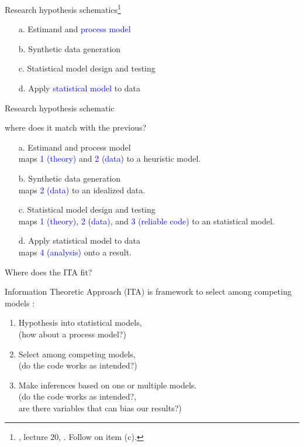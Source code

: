 \begin{lhframe}[rhgraphic={\texttt{[image: lab2.jpg]}}]
	{Research hypothesis schematics\footnote{\citet{McElreath_2022}, lecture $20$, \citet{Pearl_2019}. Follow \citet{Fogarty_et_al_2022} on item (c).}}
	
	\begin{enumerate}
		\item[a.] Estimand and \textcolor{blue}{process model}
		\item[b.] Synthetic data generation
		\item[c.] Statistical model design and testing
		\item[d.] Apply \textcolor{blue}{statistical model} to data 
	\end{enumerate} 
\end{lhframe}
%
%
\begin{lhframe}[rhgraphic={\texttt{[image: lab\_to\_research.png]}}]
	{Research hypothesis schematic}
	
	where does it match with the previous?
	\begin{enumerate}
		\item[a.] Estimand and process model\\
		\small{maps \textcolor{blue}{1 (theory)} and \textcolor{blue}{2 (data)} to a heuristic model.}
		\item[b.] Synthetic data generation \\
		\small{maps \textcolor{blue}{2 (data)} to an idealized data.}
		\item[c.] Statistical model design and testing \\
		\small{maps \textcolor{blue}{1 (theory)}, \textcolor{blue}{2 (data)}, and \textcolor{blue}{3 (reliable code)} to an statistical model.}
		\item[d.] Apply statistical model to data \\
		\small{maps \textcolor{blue}{4 (analysis)} onto a result.}
	\end{enumerate} 
\end{lhframe}
%
%
\begin{lhframe}[rhgraphic={\texttt{[image: ITA\_to\_research.png]}}]
	{Where does the ITA fit?}
	
	Information Theoretic Approach (ITA) is framework to select among competing models \cite{Anderson_2008, Chamberlain_1965}:
	\begin{enumerate}
		\item Hypothesis into statistical models, \\
		{\small \alert{(how about a process model?)} }
		\item Select among competing models,  \\
		{\small \alert{(do the code works as intended?)} }
		\item Make inferences based on one or multiple models. \\
		{\small \alert{(do the code works as intended?, \\
				are there variables that can bias our results?)} }
	\end{enumerate}
\end{lhframe}
%
%